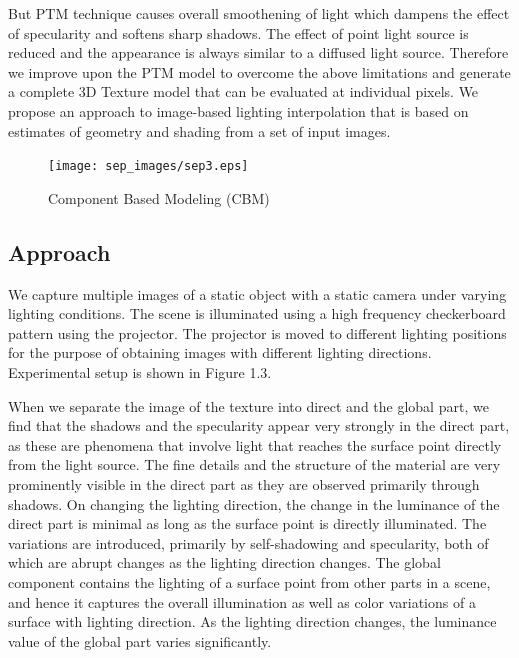 But PTM technique causes overall smoothening of light which dampens the effect
of specularity and softens sharp shadows. The effect of point light source is
reduced and the appearance is always similar to a diffused light source.
Therefore we improve upon the PTM model 
to overcome the above limitations
and generate a complete 3D Texture model that can be evaluated at individual
pixels. We propose an approach to image-based lighting interpolation that is
based on estimates of geometry and shading from a set of input images.

\begin{figure}[t]
\centering
\texttt{[image: sep\_images/sep3.eps]}

\caption{Component Based Modeling (CBM)}
\label{fig:CBM}
\end{figure}

\subsection{Approach}
We capture multiple images of a static object with a static camera under varying
lighting conditions.
The scene is
illuminated using a high frequency checkerboard pattern using the projector. The
projector is moved to different lighting positions for the purpose of obtaining
images with different lighting directions. Experimental setup is shown in Figure 1.3.

When we separate the image of the texture into direct and the global part, we find
that the shadows and the specularity appear very strongly in the direct part,
as these are phenomena that involve light that reaches the surface point
directly from the light source. The fine details and the structure of the
material are very prominently visible in the direct part as they are observed
primarily through shadows. On changing the lighting direction, the change in the
luminance of the direct part is minimal as long as the surface point is directly
illuminated. The variations are introduced, primarily by self-shadowing and
specularity, both of which are abrupt changes as the lighting direction changes.
The global component contains the lighting of a surface point from other
parts in a scene, and hence it captures the overall illumination as well as
color variations of a surface with lighting direction. As the lighting direction
changes, the luminance value of the global part varies significantly.

